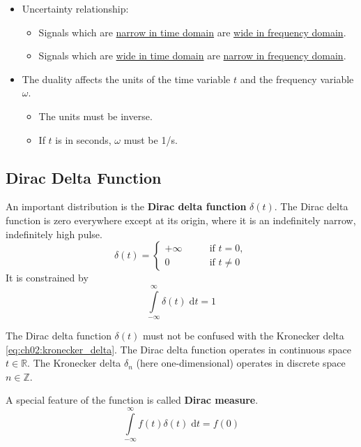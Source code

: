 \begin{refsection}
\begin{itemize}
	\item Uncertainty relationship:
	\begin{itemize}
		\item Signals which are \underline{narrow in time domain} are \underline{wide in frequency domain}.
		\item Signals which are \underline{wide in time domain} are \underline{narrow in frequency domain}.
	\end{itemize}
	\item The duality affects the units of the time variable $t$ and the frequency variable $\omega$.
	\begin{itemize}
		\item The units must be inverse.
		\item If $t$ is in seconds, $\omega$ must be \si{1/s}.
	\end{itemize}
\end{itemize}

\subsection{Dirac Delta Function}

An important distribution is the  \textbf{Dirac delta function} $\delta(t)$. The Dirac delta function is zero everywhere except at its origin, where it is an indefinitely narrow, indefinitely high pulse.
\begin{equation}
	\delta(t) = \begin{cases}
		+\infty & \qquad \text{if } t = 0, \\
		0 & \qquad \text{if } t \neq 0
	\end{cases}
	\label{eq:ch02:dirac_delta}
\end{equation}
It is constrained by
\begin{equation}
	\int\limits_{-\infty}^{\infty} \delta(t) \; \mathrm{d} t = 1
\end{equation}

\begin{attention}
	The Dirac delta function $\delta(t)$ must not be confused with the Kronecker delta \eqref{eq:ch02:kronecker_delta}. The Dirac delta function operates in continuous space $t \in \mathbb{R}$. The Kronecker delta $\delta_n$ (here one-dimensional) operates in discrete space $n \in \mathbb{Z}$.
\end{attention}

A special feature of the function is called  \textbf{Dirac measure}.
\begin{equation}
	\int\limits_{-\infty}^{\infty} f(t) \delta(t) \; \mathrm{d} t = f(0)
	\label{eq:ch02:dirac_measure}
\end{equation}


\end{refsection}
